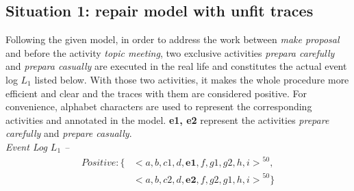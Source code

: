 \subsection{Situation 1: \small{repair model with unfit traces}} %
Following the given model, in order to address the work between \emph{make proposal} and before the activity \emph{topic meeting}, two exclusive activities \emph{prepara carefully} and \emph{prepara casually} are executed in the real life and constitutes the actual event log $L_1$ listed below. With those two activities, it makes the whole procedure more efficient and clear and the traces with them are considered positive. For convenience, alphabet characters are used to represent the corresponding activities and annotated in the model. \textbf{e1, e2} represent the activities \emph{prepare carefully} and \emph{prepare casually}.\\
\emph{Event Log $L_1$ -- }
		\begin{align*}
		Positive:\{ & { <a,b, c1,d,\textbf{e1},f,g1,g2,h,i>}^{50}, \\   &{<a,b, c2,d,\textbf{e2},f,g2,g1,h,i>}^{50} \}
		\end{align*}
